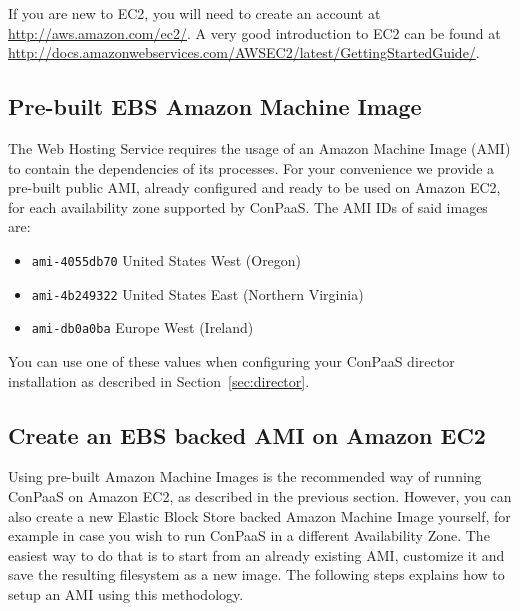 \documentclass[10pt]{article}
\begin{document}
If you are new to EC2, you will need to create an account at
\url{http://aws.amazon.com/ec2/}. A very good introduction to EC2 can be found
at \url{http://docs.amazonwebservices.com/AWSEC2/latest/GettingStartedGuide/}.

\subsection{Pre-built EBS Amazon Machine Image}

The Web Hosting Service requires the usage of an Amazon Machine Image (AMI) to
contain the dependencies of its processes. For your convenience we provide a
pre-built public AMI, already configured and ready to be used on Amazon EC2,
for each availability zone supported by ConPaaS. The AMI IDs of said images
are:

\begin{itemize}
    \item \verb+ami-4055db70+ United States West (Oregon)
    \item \verb+ami-4b249322+ United States East (Northern Virginia)
    \item \verb+ami-db0a0ba+ Europe West (Ireland)
\end{itemize}

You can use one of these values when configuring your ConPaaS director
installation as described in Section~\ref{sec:director}.

\subsection{Create an EBS backed AMI on Amazon EC2}

Using pre-built Amazon Machine Images is the recommended way of running ConPaaS
on Amazon EC2, as described in the previous section. However, you can also
create a new Elastic Block Store backed Amazon Machine Image yourself, for example
in case you wish to run ConPaaS in a different Availability Zone.
The easiest way to do that is to start from an already existing AMI, customize
it and save the resulting filesystem as a new image. The following steps explains
how to setup an AMI using this methodology.
\end{document}

